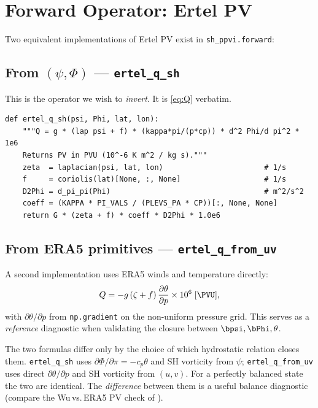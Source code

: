\chapter{Forward Operator: Ertel PV}
\label{chap:forward}

Two equivalent implementations of Ertel PV exist in
\texttt{sh\_ppvi.forward}:

\section{From $(\psi,\Phi)$ — \texttt{ertel\_q\_sh}}

This is the operator we wish to \emph{invert}.  It is
\cref{eq:Q} verbatim.

\begin{lstlisting}[caption={\texttt{forward.py: ertel\_q\_sh}},label={lst:ertel_q_sh}]
def ertel_q_sh(psi, Phi, lat, lon):
    """Q = g * (lap psi + f) * (kappa*pi/(p*cp)) * d^2 Phi/d pi^2 * 1e6
    Returns PV in PVU (10^-6 K m^2 / kg s)."""
    zeta  = laplacian(psi, lat, lon)                       # 1/s
    f     = coriolis(lat)[None, :, None]                   # 1/s
    D2Phi = d_pi_pi(Phi)                                   # m^2/s^2
    coeff = (KAPPA * PI_VALS / (PLEVS_PA * CP))[:, None, None]
    return G * (zeta + f) * coeff * D2Phi * 1.0e6
\end{lstlisting}

\section{From ERA5 primitives — \texttt{ertel\_q\_from\_uv}}

A second implementation uses ERA5 winds and temperature directly:
\begin{equation}
Q=-g\,(\zeta+f)\,\frac{\partial\theta}{\partial p}\times 10^{6}\;[\PVU],
\end{equation}
with $\partial\theta/\partial p$ from \texttt{np.gradient} on the
non-uniform pressure grid.  This serves as a \emph{reference}
diagnostic when validating the closure between $\bpsi,\bPhi,\theta$.

\begin{warnbox}
The two formulas differ only by the choice of which hydrostatic
relation closes them.  \texttt{ertel\_q\_sh} uses
$\partial\Phi/\partial\pi=-c_p\theta$ and SH vorticity from $\psi$;
\texttt{ertel\_q\_from\_uv} uses direct $\partial\theta/\partial p$
and SH vorticity from $(u,v)$.  For a perfectly balanced state the
two are identical.  The \emph{difference} between them is a useful
balance diagnostic (compare the Wu\,vs.\,ERA5 PV check of
).
\end{warnbox}
